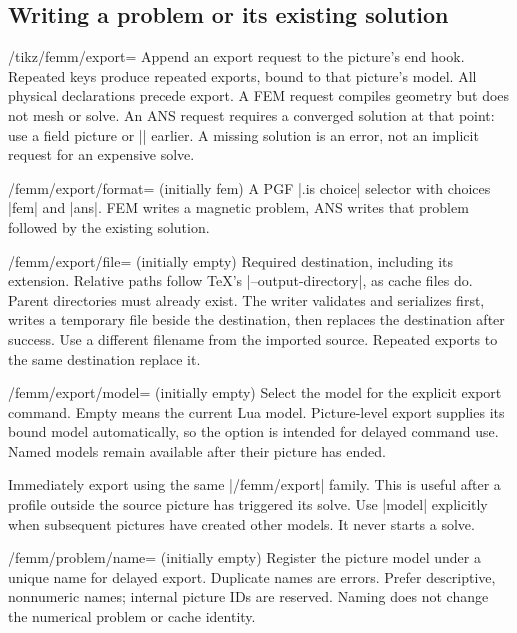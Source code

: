 \subsection{Writing a problem or its existing solution}

\begin{key}{/tikz/femm/export=}
Append an export request to the picture's end hook. Repeated keys produce repeated
exports, bound to that picture's model. All physical declarations precede export.
A FEM request compiles geometry but does not mesh or solve. An ANS request requires
a converged solution at that point: use a field picture or |\femmsolve| earlier.
A missing solution is an error, not an implicit request for an expensive solve.
\end{key}
\begin{key}{/femm/export/format= (initially fem)}
A PGF |.is choice| selector with choices |fem| and |ans|. FEM writes a magnetic
problem, ANS writes that problem followed by the existing solution.
\end{key}
\begin{key}{/femm/export/file= (initially empty)}
Required destination, including its extension. Relative paths follow TeX's
|--output-directory|, as cache files do. Parent directories must already exist.
The writer validates and serializes first, writes a temporary file beside the
destination, then replaces the destination after success. Use a different filename
from the imported source. Repeated exports to the same destination replace it.
\end{key}
\begin{key}{/femm/export/model= (initially empty)}
Select the model for the explicit export command. Empty means the current Lua
model. Picture-level export supplies its bound model automatically, so the option
is intended for delayed command use. Named models remain available after their
picture has ended.
\end{key}
\begin{command}{\femmexport{}}
Immediately export using the same |/femm/export| family. This is useful after a
profile outside the source picture has triggered its solve. Use |model| explicitly
when subsequent pictures have created other models. It never starts a solve.
\end{command}
\begin{key}{/femm/problem/name= (initially empty)}
Register the picture model under a unique name for delayed export. Duplicate
names are errors. Prefer descriptive, nonnumeric names; internal picture IDs
are reserved. Naming does not change the numerical problem or cache identity.
\end{key}
